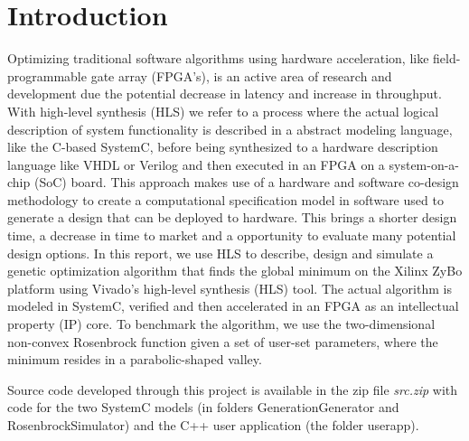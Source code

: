 \section{Introduction}
Optimizing traditional software algorithms using hardware acceleration, like field-programmable gate array (FPGA's), is an active area of research and development due the potential decrease in latency and increase in throughput. With high-level synthesis (HLS) we refer to a process where the actual logical description of system functionality is described in a abstract modeling language, like the C-based SystemC, before being synthesized to a hardware description language like VHDL or Verilog and then executed in an FPGA on a system-on-a-chip (SoC) board. This approach makes use of a hardware and software co-design methodology to create a computational specification model in software used to generate a design that can be deployed to hardware. This brings a shorter design time, a decrease in time to market and a opportunity to evaluate many potential design options. In this report, we use HLS to describe, design and simulate a genetic optimization algorithm that finds the global minimum on the Xilinx ZyBo platform using Vivado's high-level synthesis (HLS) tool. The actual algorithm is modeled in SystemC, verified and then accelerated in an FPGA as an intellectual property (IP) core. To benchmark the algorithm, we use the two-dimensional non-convex Rosenbrock function\cite{Shang2006} given a set of user-set parameters, where the minimum resides in a parabolic-shaped valley.

Source code developed through this project is available in the zip file \textit{src.zip} with code for the two SystemC models (in folders GenerationGenerator and RosenbrockSimulator) and the C++ user application (the folder userapp).